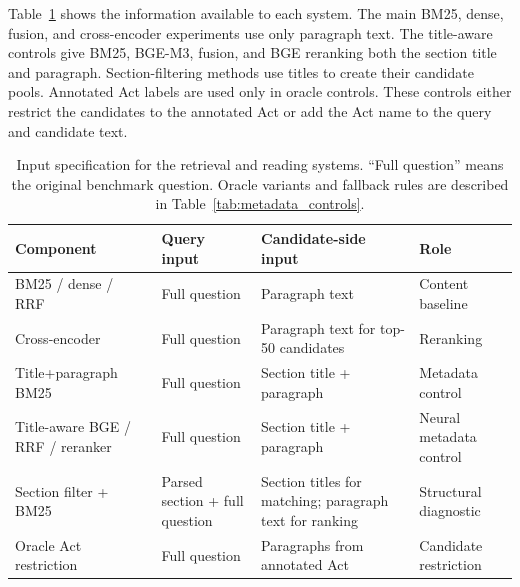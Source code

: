 \documentclass[pdflatex,sn-basic]{sn-jnl}%
\theoremstyle{thmstyleone}%
\theoremstyle{thmstyletwo}%
\theoremstyle{thmstylethree}%
\begin{document}
Table~\ref{tab:input_specification} shows the information available to each
system. The main BM25, dense, fusion, and cross-encoder experiments use only
paragraph text. The title-aware controls give BM25, BGE-M3, fusion, and BGE
reranking both the section title and paragraph. Section-filtering methods use
titles to create their candidate pools. Annotated Act labels are used only in
oracle controls. These controls either restrict the candidates to the
annotated Act or add the Act name to the query and candidate text.

\begin{table}[!htbp]
    \caption{Input specification for the retrieval and reading systems.
    ``Full question'' means the original benchmark question. Oracle variants
    and fallback rules are described in Table~\ref{tab:metadata_controls}.}
    \label{tab:input_specification}
    \centering
    \scriptsize
    \setlength{\tabcolsep}{3.5pt}
    \begin{tabular}{@{}
        >{\raggedright\arraybackslash}p{2.7cm}
        >{\raggedright\arraybackslash}p{2.5cm}
        >{\raggedright\arraybackslash}p{4.8cm}
        >{\raggedright\arraybackslash}p{2.3cm}@{}}
        \toprule
        Component & Query input & Candidate-side input & Role \\
        \midrule
        BM25 / dense / RRF
        & Full question
        & Paragraph text
        & Content baseline \\

        Cross-encoder
        & Full question
        & Paragraph text for top-50 candidates
        & Reranking \\

        Title+paragraph BM25
        & Full question
        & Section title + paragraph
        & Metadata control \\

        Title-aware BGE / RRF / reranker
        & Full question
        & Section title + paragraph
        & Neural metadata control \\

        Section filter + BM25
        & Parsed section + full question
        & Section titles for matching; paragraph text for ranking
        & Structural diagnostic \\

        Oracle Act restriction
        & Full question
        & Paragraphs from annotated Act
        & Candidate restriction \\


\end{tabular}
\end{table}
\end{document}
